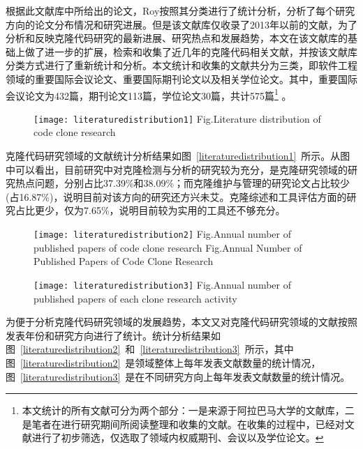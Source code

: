 根据此文献库中所给出的论文，Roy按照其分类进行了统计分析，分析了每个研究方向的论文分布情况和研究进展\cite{roy2014vision}。但是该文献库仅收录了2013年以前的文献，为了分析和反映克隆代码研究的最新进展、研究热点和发展趋势，本文在该文献库的基础上做了进一步的扩展，检索和收集了近几年的克隆代码相关文献，并按该文献库分类方式进行了重新统计和分析。本文统计和收集的文献共分为三类，即软件工程领域的重要国际会议论文、重要国际期刊论文以及相关学位论文。其中，重要国际会议论文为432篇，期刊论文113篇，学位论文30篇，共计575篇\footnote{本文统计的所有文献可分为两个部分：一是来源于阿拉巴马大学的文献库，二是笔者在进行研究期间所阅读整理和收集的文献。在收集的过程中，已经对文献进行了初步筛选，仅选取了领域内权威期刊、会议以及学位论文。} 。

\begin{figure}[htbp]
\centering
\texttt{[image: literaturedistribution1]}
{Fig.$\!$}{Literature distribution of code clone research}
\vspace{-1em}
\end{figure}

克隆代码研究领域的文献统计分析结果如图~\ref{literaturedistribution1}~所示。从图中可以看出，目前研究中对克隆检测与分析的研究较为充分，是克隆研究领域的研究热点问题，分别占比37.39\%和38.09\%；而克隆维护与管理的研究论文占比较少(占16.87\%)，说明目前对该方向的研究还方兴未艾。克隆综述和工具评估方面的研究占比更少，仅为7.65\%，说明目前较为实用的工具还不够充分。

\begin{figure}[htbp]
\centering
\texttt{[image: literaturedistribution2]}
{Fig.$\!$}{Annual number of published papers of code clone research}
{Fig.$\!$}{Annual Number of Published Papers of Code Clone Research}
\vspace{-1em}
\end{figure}

\begin{figure}[htbp]
\centering
\texttt{[image: literaturedistribution3]}
{Fig.$\!$}{Annual number of published papers of each clone research activity}
\end{figure}


为便于分析克隆代码研究领域的发展趋势，本文又对克隆代码研究领域的文献按照发表年份和研究方向进行了统计。统计分析结果如图~\ref{literaturedistribution2}~和~\ref{literaturedistribution3}~所示，其中图~\ref{literaturedistribution2}~是领域整体上每年发表文献数量的统计情况，图~\ref{literaturedistribution3}~是在不同研究方向上每年发表文献数量的统计情况。

